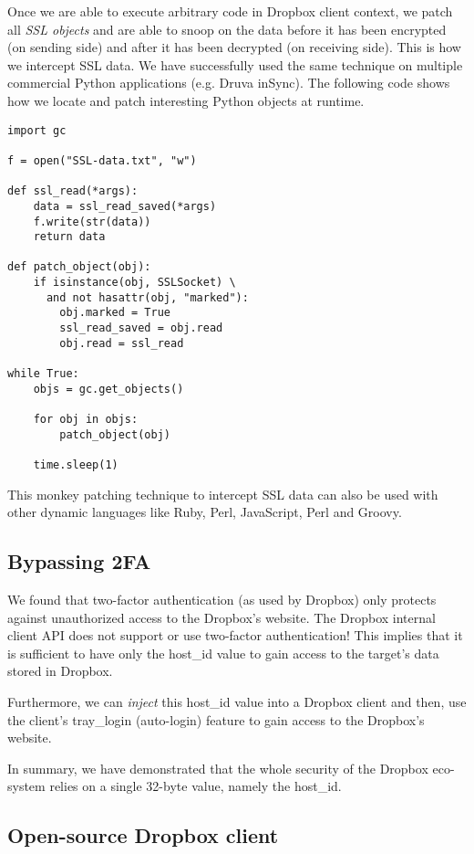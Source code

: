 \documentclass[letterpaper,twocolumn,10pt]{article}
\begin{document}
Once we are able to execute arbitrary code in Dropbox client context, we patch
all \emph{SSL objects} and are able to snoop on the data before it has been encrypted
(on sending side) and after it has been decrypted (on receiving side). This is
how we intercept SSL data. We have successfully used the same technique on
multiple commercial Python applications (e.g. Druva inSync). The following code
shows how we locate and patch interesting Python objects at runtime.

\begin{verbatim}
import gc

f = open("SSL-data.txt", "w")

def ssl_read(*args):
    data = ssl_read_saved(*args)
    f.write(str(data))
    return data

def patch_object(obj):
    if isinstance(obj, SSLSocket) \
      and not hasattr(obj, "marked"):
        obj.marked = True
        ssl_read_saved = obj.read
        obj.read = ssl_read

while True:
    objs = gc.get_objects()

    for obj in objs:
        patch_object(obj)

    time.sleep(1)
\end{verbatim}

This monkey patching technique to intercept SSL data can also be used with
other dynamic languages like Ruby, Perl, JavaScript, Perl and Groovy.

\subsection{Bypassing 2FA}

We found that two-factor authentication (as used by Dropbox) only protects
against unauthorized access to the Dropbox's website. The Dropbox internal
client API does not support or use two-factor authentication! This implies
that it is sufficient to have only the host\_id value to gain access to
the target's data stored in Dropbox.

Furthermore, we can \emph{inject} this host\_id value into a Dropbox client and
then, use the client's tray\_login (auto-login) feature to gain access to the
Dropbox's website.

In summary, we have demonstrated that the whole security of the Dropbox
eco-system relies on a single 32-byte value, namely the host\_id.

\subsection{Open-source Dropbox client}
\end{document}
